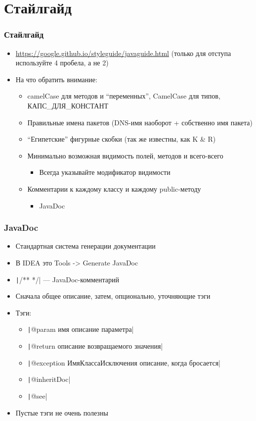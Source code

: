 \documentclass[xetex,mathserif,serif]{beamer}
\begin{document}
	\section{Стайлгайд}

	\begin{frame}
		\frametitle{Стайлгайд}
		\begin{itemize}
			\item \url{https://google.github.io/styleguide/javaguide.html} (только для отступа используйте 4 пробела, а не 2)
			\item На что обратить внимание:
			\begin{itemize}
				\item camelCase для методов и ``переменных'', CamelCase для типов, КАПС\_ДЛЯ\_КОНСТАНТ
				\item Правильные имена пакетов (DNS-имя наоборот + собственно имя пакета)
				\item ``Египетские'' фигурные скобки (так же известны, как K \& R)
				\item Минимально возможная видимость полей, методов и всего-всего
				\begin{itemize}
					\item Всегда указывайте модификатор видимости
				\end{itemize}
				\item Комментарии к каждому классу и каждому public-методу
				\begin{itemize}
					\item JavaDoc
				\end{itemize}
			\end{itemize}
		\end{itemize}
	\end{frame}

	\begin{frame}
		\frametitle{JavaDoc}
		\begin{itemize}
			\item Стандартная система генерации документации
			\item В IDEA это Tools -> Generate JavaDoc
			\item \texttt|/**  */| --- JavaDoc-комментарий
			\item Сначала общее описание, затем, опционально, уточняющие тэги
			\item Тэги:
			\begin{itemize}
				\item \texttt|@param имя описание параметра|
				\item \texttt|@return описание возвращаемого значения|
				\item \texttt|@exception ИмяКлассаИсключения описание, когда бросается|
				\item \texttt|{@inheritDoc}|
				\item \texttt|@see|
			\end{itemize}
			\item Пустые тэги не очень полезны
		\end{itemize}
	\end{frame}
\end{document}
